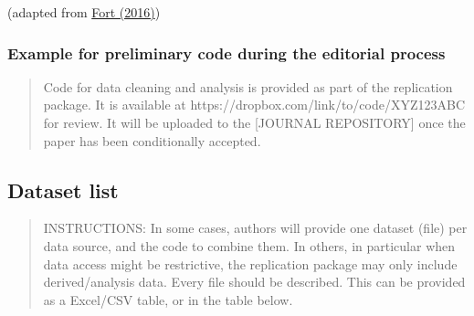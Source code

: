 \documentclass[
]{article}
\begin{document}
(adapted from \href{https://doi.org/10.1593/restud/rdw057}{Fort (2016)})

\hypertarget{example-for-preliminary-code-during-the-editorial-process}{%
\subsubsection{Example for preliminary code during the editorial
process}\label{example-for-preliminary-code-during-the-editorial-process}}

\begin{quote}
Code for data cleaning and analysis is provided as part of the
replication package. It is available at
https://dropbox.com/link/to/code/XYZ123ABC for review. It will be
uploaded to the {[}JOURNAL REPOSITORY{]} once the paper has been
conditionally accepted.
\end{quote}

\hypertarget{dataset-list}{%
\subsection{Dataset list}\label{dataset-list}}

\begin{quote}
INSTRUCTIONS: In some cases, authors will provide one dataset (file) per
data source, and the code to combine them. In others, in particular when
data access might be restrictive, the replication package may only
include derived/analysis data. Every file should be described. This can
be provided as a Excel/CSV table, or in the table below.
\end{quote}
\end{document}
